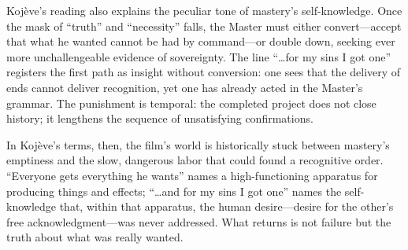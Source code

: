 Koj{\`e}ve's reading also explains the peculiar tone of mastery's self-knowledge. Once the mask
of ``truth'' and ``necessity'' falls, the Master must either convert—accept that what he wanted
cannot be had by command—or double down, seeking ever more unchallengeable evidence of
sovereignty. The line ``\ldots for my sins I got one'' registers the first path as insight
without conversion: one sees that the delivery of ends cannot deliver recognition, yet one has
already acted in the Master's grammar. The punishment is temporal: the completed project does
not close history; it lengthens the sequence of unsatisfying confirmations.

In Koj{\`e}ve's terms, then, the film's world is historically stuck between mastery's emptiness
and the slow, dangerous labor that could found a recognitive order. ``Everyone gets everything
he wants'' names a high-functioning apparatus for producing things and effects; ``\ldots and for
my sins I got one'' names the self-knowledge that, within that apparatus, the human desire—desire
for the other's free acknowledgment—was never addressed. What returns is not failure but the
truth about what was really wanted.
